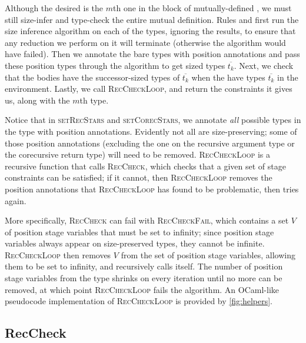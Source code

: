 \documentclass[nonacm,screen,10pt]{acmart}
\begin{document}
Although the desired \cofixpoint is the $m$th one in the block of mutually-defined \cofixpoints, we must still size-infer and type-check the entire mutual definition. Rules  and  first run the size inference algorithm on each of the \cofixpoint types, ignoring the results, to ensure that any reduction we perform on it will terminate (otherwise the algorithm would have failed). Then we annotate the bare types with position annotations and pass these position types through the algorithm to get sized types $\overline{t_k}$. Next, we check that the \cofixpoint bodies have the successor-sized types of $\overline{t_k}$ when the \cofixpoints have types $\overline{t_k}$ in the environment. Lastly, we call \textsc{RecCheckLoop}, and return the constraints it gives us, along with the $m$th \cofixpoint type.



Notice that in \textsc{setRecStars} and \textsc{setCorecStars}, we annotate \textit{all} possible \coinductive types in the \cofixpoint type with position annotations. Evidently not all \cofixpoints are size-preserving; some of those position annotations (excluding the one on the recursive argument type or the corecursive return type) will need to be removed. \textsc{RecCheckLoop} is a recursive function that calls \textsc{RecCheck}, which checks that a given set of stage constraints can be satisfied; if it cannot, then \textsc{RecCheckLoop} removes the position annotations that \textsc{RecCheckLoop} has found to be problematic, then tries again. 

More specifically, \textsc{RecCheck} can fail with \textsc{RecCheckFail}, which contains a set $V$ of position stage variables that must be set to infinity; since position stage variables always appear on size-preserved types, they cannot be infinite. \textsc{RecCheckLoop} then removes $V$ from the set of position stage variables, allowing them to be set to infinity, and recursively calls itself. The number of position stage variables from the \cofixpoint type shrinks on every iteration until no more can be removed, at which point \textsc{RecCheckLoop} fails the algorithm. An OCaml-like pseudocode implementation of \textsc{RecCheckLoop} is provided by \autoref{fig:helpers}.

\subsection{RecCheck}
\end{document}
